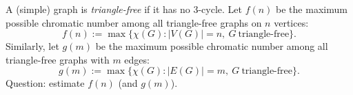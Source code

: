 A (simple) graph is \emph{triangle-free} if it has no $3$-cycle.
Let $f(n)$ be the maximum possible chromatic number among all triangle-free graphs on $n$ vertices:
\[f(n):=\max\{\chi(G): |V(G)|=n,\ G\ \text{triangle-free}\}.
\]
Similarly, let $g(m)$ be the maximum possible chromatic number among all triangle-free graphs with $m$ edges:
\[g(m):=\max\{\chi(G): |E(G)|=m,\ G\ \text{triangle-free}\}.
\]
Question: estimate $f(n)$ (and $g(m)$).
